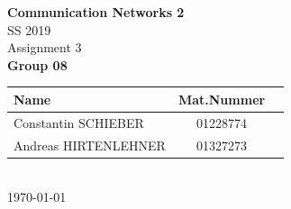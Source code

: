 \documentclass[parskip=full]{scrartcl}
\begin{document}
\begin{titlepage}
    \centering
    \vspace*{2cm}
    {\Huge \textbf{Communication Networks 2}}\\
    SS 2019\\
    \vspace*{1cm}
    {\Large Assignment 3}
    \\\vspace*{3cm}
    {\Large \textbf{Group 08}}\\
    \vspace*{1cm}
    {\large 
        \begin{tabular}{l c c}
            Name & Mat.Nummer \\ \hline
            Constantin SCHIEBER & 01228774 \\
            Andreas HIRTENLEHNER & 01327273
        \end{tabular}
    }
    \\\vspace*{7cm}
    \today
\end{titlepage}

\end{document}
